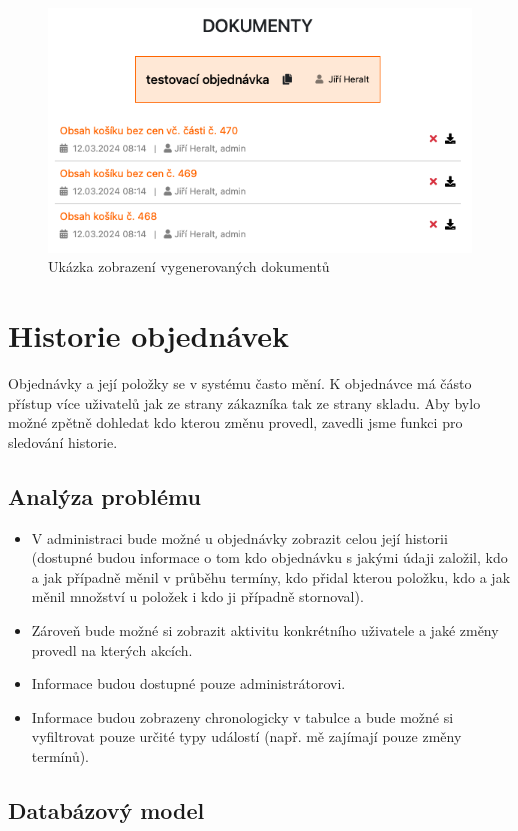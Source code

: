 \begin{figure}
    \centering
    \includegraphics[width=0.5\linewidth]{Figures/karta-dokumenty.png}
    \caption{Ukázka zobrazení vygenerovaných dokumentů}
    \label{fig:enter-label}
\end{figure}

\section{Historie objednávek}

Objednávky a její položky se v systému často mění. K objednávce má částo přístup více uživatelů jak ze strany zákazníka tak ze strany skladu. Aby bylo možné zpětně dohledat kdo kterou změnu provedl, zavedli jsme funkci pro sledování historie. 

\subsection{Analýza problému}

\begin{itemize}
    \item V administraci bude možné u objednávky zobrazit celou její historii (dostupné budou informace o tom kdo objednávku s jakými údaji založil, kdo a jak případně měnil v průběhu termíny, kdo přidal kterou položku, kdo a jak měnil množství u položek i kdo ji případně stornoval).
    \item Zároveň bude možné si zobrazit aktivitu konkrétního uživatele a jaké změny provedl na kterých akcích.
    \item Informace budou dostupné pouze administrátorovi.
    \item Informace budou zobrazeny chronologicky v tabulce a bude možné si vyfiltrovat pouze určité typy událostí (např. mě zajímají pouze změny termínů).
\end{itemize}

\subsection{Databázový model}

